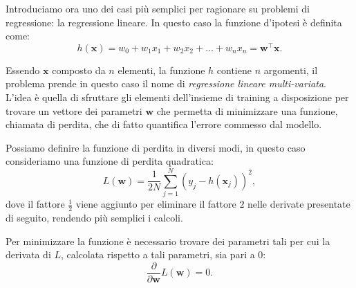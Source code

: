 \documentclass[../../main.tex]{subfiles}
\begin{document}
    Introduciamo ora uno dei casi più semplici per ragionare su problemi di regressione: la regressione lineare. In questo caso la funzione d'ipotesi è definita come:
    \begin{equation}
        h(\boldsymbol{x}) = w_0 + w_1x_1 + w_2x_2 + \dots + w_nx_n = \boldsymbol{w}^\top \boldsymbol{x}.
        \label{eqn:linearhypotes}   
    \end{equation}

    Essendo $\boldsymbol{x}$  composto da $n$ elementi, la funzione $h$ contiene $n$ argomenti, il problema prende in questo caso il nome di \textit{regressione lineare multi-variata}. L'idea è quella di sfruttare gli elementi dell'insieme di training a disposizione per trovare un vettore dei parametri $\boldsymbol{w}$ che permetta di minimizzare  una funzione, chiamata di perdita, che di fatto quantifica l'errore commesso dal modello.
    
    Possiamo definire la funzione di perdita in diversi modi, in questo caso consideriamo una funzione di perdita quadratica:
    \begin{equation}
        L(\boldsymbol{w}) = \frac{1}{2N} \sum_{j=1}^N(y_j - h(\boldsymbol{x}_j))^2,
        \label{eqn:lossquadratica}
    \end{equation}
    dove il fattore $\frac{1}{2}$ viene aggiunto per eliminare il fattore $2$ nelle derivate presentate di seguito, rendendo più semplici i calcoli.

    Per minimizzare la funzione è necessario trovare dei parametri tali per cui la derivata di $L$, calcolata rispetto a tali parametri, sia pari a 0:
    \[\frac{\partial}{\partial \boldsymbol{w}} L(\boldsymbol{w}) = 0.\]
\end{document}
